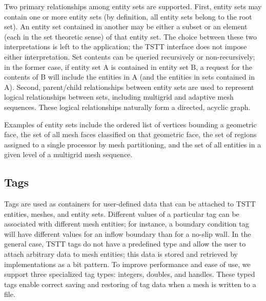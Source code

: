 Two primary relationships among entity sets are supported. First,
entity sets may contain one or more entity sets (by definition, all
entity sets belong to the root set). An entity set contained
in another may be either a subset or an element (each in the set theoretic
sense) of that entity set. The choice between these two interpretations
is left to the application; the TSTT interface does not impose either
interpretation. Set contents can be queried recursively or non-recursively;
in the former case, if entity set A is contained in entity set B,
a request for the contents of B will include the entities in A (and
the entities in sets contained in A). Second, parent/child relationships
between entity sets are used to represent logical relationships between
sets, including multigrid and adaptive mesh sequences. These logical
relationships naturally form a directed, acyclic graph.

Examples of entity sets include the ordered list of vertices bounding
a geometric face, the set of all mesh faces classified on that geometric
face, the set of regions assigned to a single processor by mesh partitioning,
and the set of all entities in a given level of a multigrid mesh sequence. 


\subsection{Tags\label{sub:Tags}}

Tags are used as containers for user-defined data that can be attached
to TSTT entities, meshes, and entity sets. Different values of a particular
tag can be associated with different mesh entities; for instance,
a boundary condition tag will have different values for an inflow
boundary than for a no-slip wall. In the general case, TSTT tags do
not have a predefined type and allow the user to attach arbitrary
data to mesh entities; this data is stored and retrieved by implementations
as a bit pattern. To improve performance and ease of use, we support
three specialized tag types: integers, doubles, and handles. These
typed tags enable correct saving and restoring of tag data when a
mesh is written to a file.
